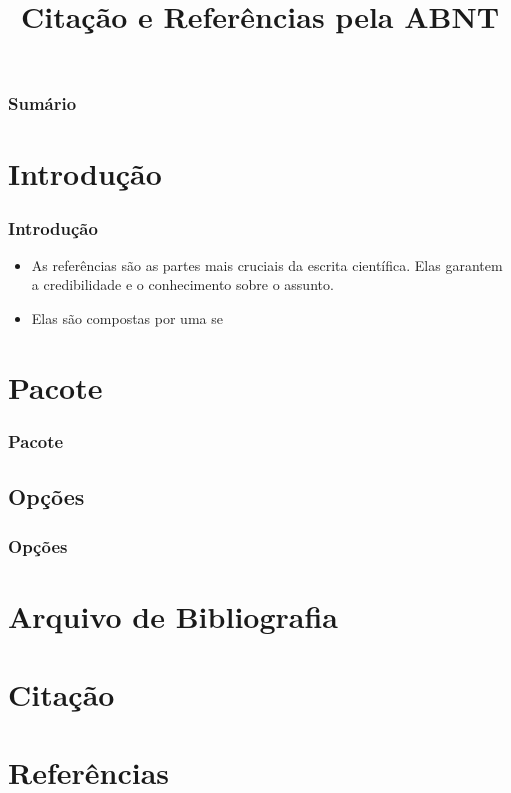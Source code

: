 \documentclass[brazilian,a4paper]{beamer}
\title{Citação e Referências pela ABNT}
\begin{document}
\frame{\titlepage}

\begin{frame}
    \frametitle{Sumário}
    \tableofcontents
\end{frame}

\section{Introdução}
\begin{frame}
    \frametitle{Introdução}

    \begin{itemize}
        \item As referências são as partes mais cruciais da escrita científica. Elas garantem a credibilidade e o conhecimento sobre o assunto. 
        \item Elas são compostas por uma se
    \end{itemize}

\end{frame}

\section{Pacote}
\begin{frame}[fragile]
    \frametitle{Pacote}

    

\end{frame}

\subsection{Opções}
\begin{frame}[fragile]
    \frametitle{Opções}

    

\end{frame}

\section{Arquivo de Bibliografia}


\section{Citação}

\section{Referências}
\end{document}

